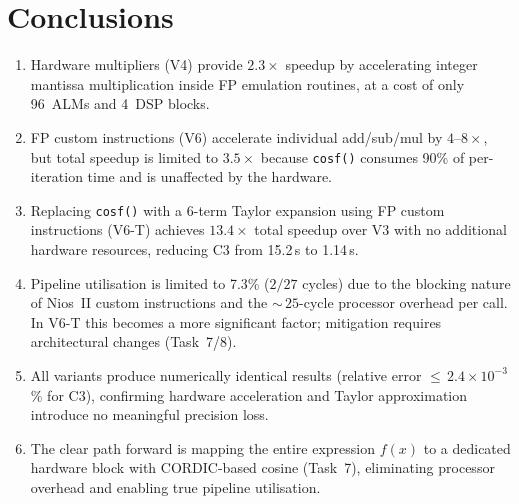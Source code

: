 \documentclass[a4paper,10pt,twocolumn]{article}
\begin{document}
\section{Conclusions}

\begin{enumerate}
\item Hardware multipliers (V4) provide $2.3\times$ speedup by accelerating integer mantissa multiplication inside FP emulation routines, at a cost of only 96~ALMs and 4~DSP blocks.

\item FP custom instructions (V6) accelerate individual add/sub/mul by $4\text{--}8\times$, but total speedup is limited to $3.5\times$ because \texttt{cosf()} consumes 90\% of per-iteration time and is unaffected by the hardware.

\item Replacing \texttt{cosf()} with a 6-term Taylor expansion using FP custom instructions (V6-T) achieves $\mathbf{13.4\times}$ total speedup over V3 with no additional hardware resources, reducing C3 from 15.2\,s to 1.14\,s.

\item Pipeline utilisation is limited to 7.3\% ($2/27$ cycles) due to the blocking nature of Nios~II custom instructions and the ${\sim}\,25$-cycle processor overhead per call.
In V6-T this becomes a more significant factor; mitigation requires architectural changes (Task~7/8).

\item All variants produce numerically identical results (relative error ${\leq}\,2.4\!\times\!10^{-3}$\% for C3), confirming hardware acceleration and Taylor approximation introduce no meaningful precision loss.

\item The clear path forward is mapping the entire expression $f(x)$ to a dedicated hardware block with CORDIC-based cosine (Task~7), eliminating processor overhead and enabling true pipeline utilisation.
\end{enumerate}

\FloatBarrier
\end{document}
